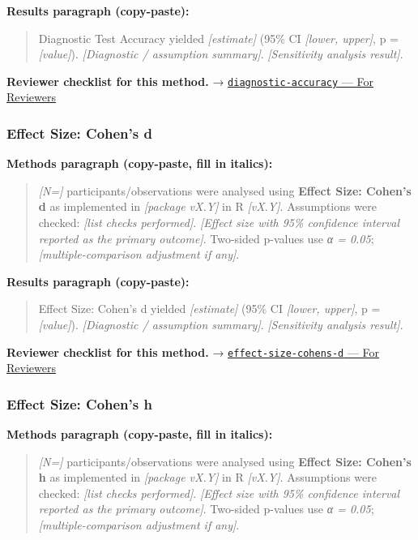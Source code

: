 \documentclass[
]{article}
\begin{document}
\textbf{Results paragraph (copy-paste):}

\begin{quote}
Diagnostic Test Accuracy yielded \emph{{[}estimate{]}} (95\% CI
\emph{{[}lower, upper{]}}, p = \emph{{[}value{]}}). \emph{{[}Diagnostic
/ assumption summary{]}}. \emph{{[}Sensitivity analysis result{]}}.
\end{quote}

\textbf{Reviewer checklist for this method.} →
\href{../chapters/14-clinical/diagnostic-accuracy.Rmd\#for-reviewers}{\texttt{diagnostic-accuracy}
--- For Reviewers}

\subsubsection{Effect Size: Cohen's d}\label{effect-size-cohens-d}

\textbf{Methods paragraph (copy-paste, fill in italics):}

\begin{quote}
\emph{{[}N={]}} participants/observations were analysed using
\textbf{Effect Size: Cohen's d} as implemented in \emph{{[}package
vX.Y{]}} in R \emph{{[}vX.Y{]}}. Assumptions were checked: \emph{{[}list
checks performed{]}}. \emph{{[}Effect size with 95\% confidence interval
reported as the primary outcome{]}}. Two-sided p-values use \emph{α =
0.05}; \emph{{[}multiple-comparison adjustment if any{]}}.
\end{quote}

\textbf{Results paragraph (copy-paste):}

\begin{quote}
Effect Size: Cohen's d yielded \emph{{[}estimate{]}} (95\% CI
\emph{{[}lower, upper{]}}, p = \emph{{[}value{]}}). \emph{{[}Diagnostic
/ assumption summary{]}}. \emph{{[}Sensitivity analysis result{]}}.
\end{quote}

\textbf{Reviewer checklist for this method.} →
\href{../chapters/05-power/effect-size-cohens-d.Rmd\#for-reviewers}{\texttt{effect-size-cohens-d}
--- For Reviewers}

\subsubsection{Effect Size: Cohen's h}\label{effect-size-cohens-h}

\textbf{Methods paragraph (copy-paste, fill in italics):}

\begin{quote}
\emph{{[}N={]}} participants/observations were analysed using
\textbf{Effect Size: Cohen's h} as implemented in \emph{{[}package
vX.Y{]}} in R \emph{{[}vX.Y{]}}. Assumptions were checked: \emph{{[}list
checks performed{]}}. \emph{{[}Effect size with 95\% confidence interval
reported as the primary outcome{]}}. Two-sided p-values use \emph{α =
0.05}; \emph{{[}multiple-comparison adjustment if any{]}}.
\end{quote}
\end{document}

